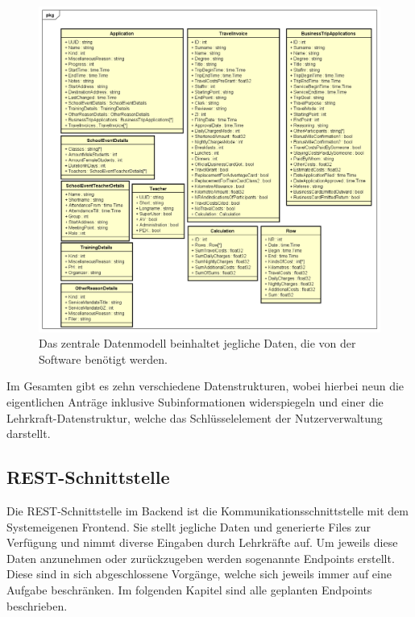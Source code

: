 \begin{figure}[H]
	\centering
	\includegraphics[width=\linewidth]{images/mbeier_konzept/Datamodel}
	\caption[Zentrales Datenmodell]{Das zentrale Datenmodell beinhaltet jegliche Daten, die von der Software benötigt werden.}
	\label{fig:datamodel}
\end{figure}

Im Gesamten gibt es zehn verschiedene Datenstrukturen, wobei hierbei neun die eigentlichen Anträge inklusive Subinformationen widerspiegeln und einer die Lehrkraft-Datenstruktur, welche das Schlüsselelement der Nutzerverwaltung darstellt.

\newpage

\subsection{REST-Schnittstelle}

Die REST-Schnittstelle im Backend ist die Kommunikationsschnittstelle mit dem Systemeigenen Frontend. Sie stellt jegliche Daten und generierte Files zur Verfügung und nimmt diverse Eingaben durch Lehrkräfte auf. Um jeweils diese Daten anzunehmen oder zurückzugeben werden sogenannte Endpoints erstellt. Diese sind in sich abgeschlossene Vorgänge, welche sich jeweils immer auf eine Aufgabe beschränken. Im folgenden Kapitel sind alle geplanten Endpoints beschrieben.

